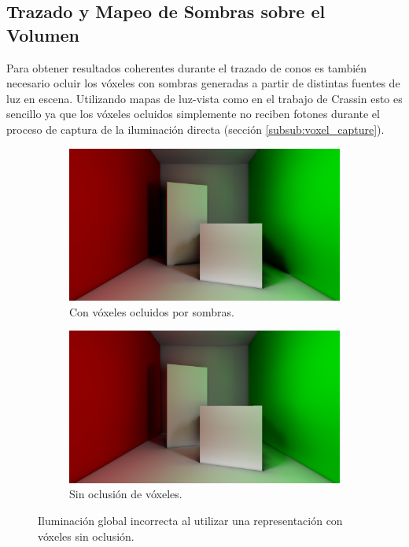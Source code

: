 \subsection{Trazado y Mapeo de Sombras sobre el Volumen} %
\label{sub:trazado_de_sombras_sobre_el_volumen}

Para obtener resultados coherentes durante el trazado de conos es también necesario ocluir los vóxeles con sombras generadas a partir de distintas fuentes de luz en escena. Utilizando mapas de luz-vista como en el trabajo de Crassin esto es sencillo ya que los vóxeles ocluidos simplemente no reciben fotones durante el proceso de captura de la iluminación directa (sección \ref{subsub:voxel_capture}).

\begin{figure}[H]
	\centering
	\begin{subfigure}[t]{0.49\textwidth}
		\centering
		\captionsetup{justification=centering}
		\includegraphics[width=\linewidth]{media/voxel_shadowing.png}
		\caption*{Con vóxeles ocluidos por sombras.}
	\end{subfigure}%
	\hspace{0.01\textwidth}
	\begin{subfigure}[t]{0.49\textwidth}
		\centering
		\captionsetup{justification=centering}
		\includegraphics[width=\linewidth]{media/voxel_noshadowing.png}
		\caption*{Sin oclusión de vóxeles.}
	\end{subfigure}%
	\caption{Iluminación global incorrecta al utilizar una representación con vóxeles sin oclusión.}
	\label{fig:voxel_shadow_error}
\end{figure}


